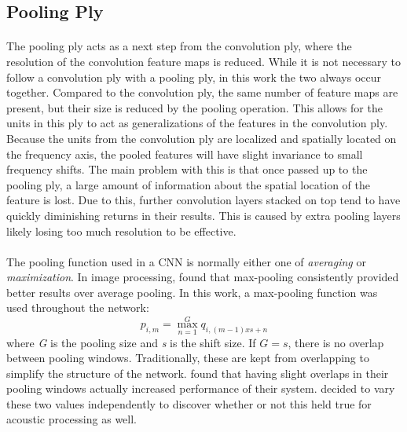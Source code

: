 \documentclass[letterpaper]{article}
\begin{document}
\subsection*{Pooling Ply}

\paragraph{}The pooling ply acts as a next step from the convolution ply, where the resolution of the convolution feature maps is reduced. While it is not necessary to follow a convolution ply with a pooling ply, in this work the two always occur together. Compared to the convolution ply, the same number of feature maps are present, but their size is reduced by the pooling operation. This allows for the units in this ply to act as generalizations of the features in the convolution ply. Because the units from the convolution ply are localized and spatially located on the frequency axis, the pooled features will have slight invariance to small frequency shifts. The main problem with this is that once passed up to the pooling ply, a large amount of information about the spatial location of the feature is lost. Due to this, further convolution layers stacked on top tend to have quickly diminishing returns in their results. This is caused by extra pooling layers likely losing too much resolution to be effective.

\paragraph{}The pooling function used in a CNN is normally either one of \textit{averaging} or \textit{maximization}. In image processing, \cite{DBLP:conf/icann/SchererMB10} found that max-pooling consistently provided better results over average pooling. In this work, a max-pooling function was used throughout the network:
\begin{equation*}
p_{i,m} = \max_{n=1}^{G} q_{i, (m-1)xs+n}
\end{equation*}
where \textit{G} is the pooling size and \textit{s} is the shift size. If $G=s$, there is no overlap between pooling windows. Traditionally, these are kept from overlapping to simplify the structure of the network. \cite{DBLP:conf/nips/KrizhevskySH12} found that having slight overlaps in their pooling windows actually increased performance of their system. \cite{DBLP:journals/taslp/Abdel-HamidMJDPY14} decided to vary these two values independently to discover whether or not this held true for acoustic processing as well. 
\end{document}
